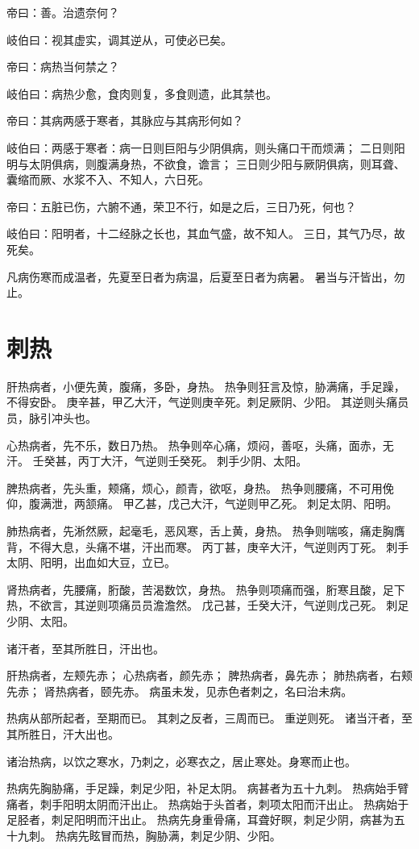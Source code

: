 \documentclass{article}%
\begin{document}
帝曰：善。治遗奈何？

岐伯曰：视其虚实，调其逆从，可使必已矣。

帝曰：病热当何禁之？

岐伯曰：病热少愈，食肉则复，多食则遗，此其禁也。

帝曰：其病两感于寒者，其脉应与其病形何如？

岐伯曰：两感于寒者：病一日则巨阳与少阴俱病，则头痛口干而烦满；
二日则阳明与太阴俱病，则腹满身热，不欲食，谵言；
三日则少阳与厥阴俱病，则耳聋、囊缩而厥、水浆不入、不知人，六日死。

帝曰：五脏已伤，六腑不通，荣卫不行，如是之后，三日乃死，何也？

岐伯曰：阳明者，十二经脉之长也，其血气盛，故不知人。
三日，其气乃尽，故死矣。

凡病伤寒而成温者，先夏至日者为病温，后夏至日者为病暑。
暑当与汗皆出，勿止。


\section{刺热}
肝热病者，小便先黄，腹痛，多卧，身热。
热争则狂言及惊，胁满痛，手足躁，不得安卧。
庚辛甚，甲乙大汗，气逆则庚辛死。刺足厥阴、少阳。
其逆则头痛员员，脉引冲头也。

心热病者，先不乐，数日乃热。
热争则卒心痛，烦闷，善呕，头痛，面赤，无汗。
壬癸甚，丙丁大汗，气逆则壬癸死。
刺手少阴、太阳。

脾热病者，先头重，颊痛，烦心，颜青，欲呕，身热。
热争则腰痛，不可用俛仰，腹满泄，两颔痛。
甲乙甚，戊己大汗，气逆则甲乙死。
刺足太阴、阳明。

肺热病者，先淅然厥，起毫毛，恶风寒，舌上黄，身热。
热争则喘咳，痛走胸膺背，不得大息，头痛不堪，汗出而寒。
丙丁甚，庚辛大汗，气逆则丙丁死。
刺手太阴、阳明，出血如大豆，立已。

肾热病者，先腰痛，胻酸，苦渴数饮，身热。
热争则项痛而强，胻寒且酸，足下热，不欲言，其逆则项痛员员澹澹然。
戊己甚，壬癸大汗，气逆则戊己死。
刺足少阴、太阳。

诸汗者，至其所胜日，汗出也。

肝热病者，左颊先赤；
心热病者，颜先赤；
脾热病者，鼻先赤；
肺热病者，右颊先赤；
肾热病者，颐先赤。
病虽未发，见赤色者刺之，名曰治未病。

热病从部所起者，至期而已。
其刺之反者，三周而已。
重逆则死。
诸当汗者，至其所胜日，汗大出也。

诸治热病，以饮之寒水，乃刺之，必寒衣之，居止寒处。身寒而止也。

热病先胸胁痛，手足躁，刺足少阳，补足太阴。
病甚者为五十九刺。
热病始手臂痛者，刺手阳明太阴而汗出止。
热病始于头首者，刺项太阳而汗出止。
热病始于足胫者，刺足阳明而汗出止。
热病先身重骨痛，耳聋好瞑，刺足少阴，病甚为五十九刺。
热病先眩冒而热，胸胁满，刺足少阴、少阳。
\end{document}
